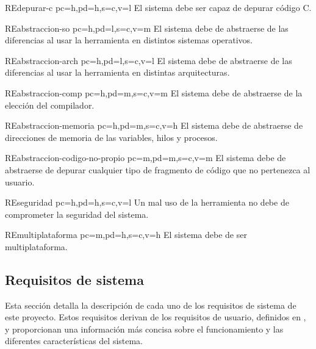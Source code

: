 \begin{userReq}{RE}{depurar-c}
    {pc=h,pd=h,s=c,v=l}
    El sistema debe ser capaz de \gls{depurar} código C.
\end{userReq}

\begin{userReq}{RE}{abstraccion-so}
    {pc=h,pd=l,s=c,v=m}
    El sistema debe de abstraerse de las diferencias al usar la herramienta en distintos sistemas operativos.
\end{userReq}

\begin{userReq}{RE}{abstraccion-arch}
    {pc=h,pd=l,s=c,v=l}
    El sistema debe de abstraerse de las diferencias al usar la herramienta en distintas arquitecturas.
\end{userReq}

\begin{userReq}{RE}{abstraccion-comp}
    {pc=h,pd=m,s=c,v=m}
    El sistema debe de abstraerse de la elección del compilador.
\end{userReq}

\begin{userReq}{RE}{abstraccion-memoria}
    {pc=h,pd=m,s=c,v=h}
    El sistema debe de abstraerse de direcciones de memoria de las variables, \glspl{hilo} y procesos.
\end{userReq}

\begin{userReq}{RE}{abstraccion-codigo-no-propio}
    {pc=m,pd=m,s=c,v=m}
    El sistema debe de abstraerse de depurar cualquier tipo de fragmento de código que no pertenezca al usuario.
\end{userReq}

\begin{userReq}{RE}{seguridad}
    {pc=h,pd=h,s=c,v=l}
    Un mal uso de la herramienta no debe de comprometer la seguridad del sistema.
\end{userReq}

\begin{userReq}{RE}{multiplataforma}
    {pc=m,pd=h,s=c,v=h}
    El sistema debe de ser \gls{multiplataforma}.
\end{userReq}

\FloatBarrier

\subsection{Requisitos de sistema}\label{subsec:requisitos-sistema}

Esta sección detalla la descripción de cada uno de los requisitos de sistema de este proyecto. Estos requisitos derivan de los requisitos de usuario, definidos en , y proporcionan una información más concisa sobre el funcionamiento y las diferentes características del sistema.

